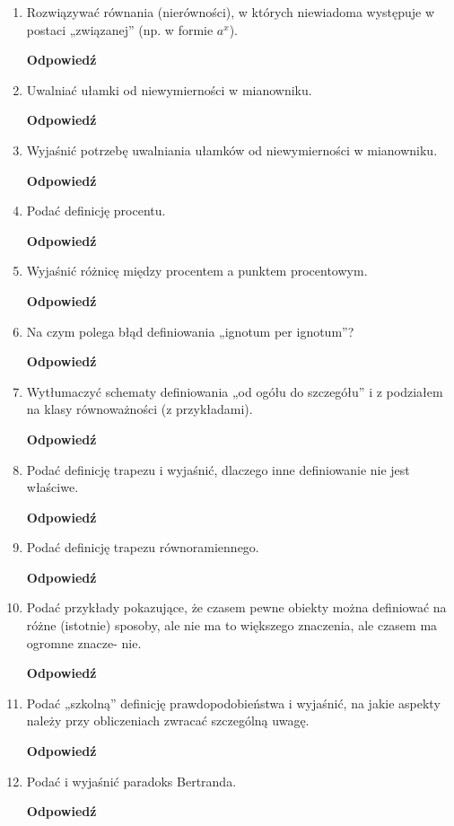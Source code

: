 \documentclass[12pt,a4paper]{article}
\theoremstyle{break}
\newcommand{\Odp}[1]{
		\begin{mdframed}[style=zadanie]
			\textbf{Odpowiedź}\\
			#1
		\end{mdframed}
	}
\begin{document}
\begin{enumerate}[1.]
	\item Rozwiązywać równania (nierówności), w których niewiadoma występuje w postaci	„związanej” (np. w formie $a^x$).
	\Odp{
	
	}
	
	\item Uwalniać ułamki od niewymierności w mianowniku.
	\Odp{
	
	}
	
	\item Wyjaśnić potrzebę uwalniania ułamków od niewymierności w mianowniku.
	\Odp{
	
	}
	
	\item Podać definicję procentu.
	\Odp{
	
	}
	
	\item Wyjaśnić różnicę między procentem a punktem procentowym.
	\Odp{
	
	}
	
	\item Na czym polega błąd definiowania „ignotum per ignotum”?
	\Odp{
	
	}
	
	\item Wytłumaczyć schematy definiowania „od ogółu do szczegółu” i z podziałem na klasy
	równoważności (z przykładami).
	\Odp{
	
	}
	
	\item Podać definicję trapezu i wyjaśnić, dlaczego inne definiowanie nie jest właściwe.
	\Odp{
	
	}
	
	\item Podać definicję trapezu równoramiennego.
	\Odp{
	
	}
	
	\item Podać przykłady pokazujące, że czasem pewne obiekty można definiować na różne
	(istotnie) sposoby, ale nie ma to większego znaczenia, ale czasem ma ogromne znacze-
	nie.
	\Odp{
	
	}
	
	\item Podać „szkolną” definicję prawdopodobieństwa i wyjaśnić, na jakie aspekty należy
	przy obliczeniach zwracać szczególną uwagę.
	\Odp{
	
	}
	
	\item Podać i wyjaśnić paradoks Bertranda.
	\Odp{
	
	}
	

\end{enumerate}
\end{document}
